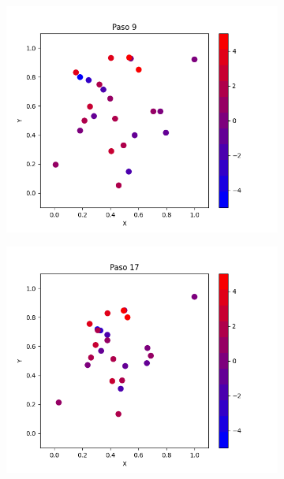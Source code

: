 \documentclass{report}
\begin{document}
\begin{figure}[h]
\begin{subfigure}[b]{0.3\textwidth}
     \end{subfigure}
     \begin{subfigure}[b]{0.3\textwidth}
         \centering
         \includegraphics[width=\textwidth]{Images/Images_c/p9pc_t09.png}
     \end{subfigure}
     \begin{subfigure}[b]{0.3\textwidth}
         \centering
         \includegraphics[width=\textwidth]{Images/Images_c/p9pc_t17.png}
     \end{subfigure}
     \begin{subfigure}[b]{0.3\textwidth}

\end{subfigure}
\end{figure}
\end{document}

